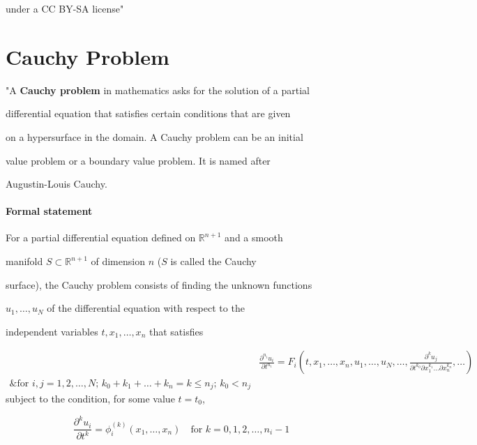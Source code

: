     under a CC BY-SA license"

\section{Cauchy Problem}
\label{sec:cauchy-problem}

"A \textbf{Cauchy problem} in mathematics asks for the solution of a partial

differential equation that satisfies certain conditions that are given

on a hypersurface in the domain. A Cauchy problem can be an initial

value problem or a boundary value problem. It is named after

Augustin-Louis Cauchy.



\paragraph{Formal statement}



For a partial differential equation defined on $\mathbb{R}^{n+1}$ and a smooth

manifold $S \subset \mathbb{R}^{n+1}$ of dimension $n$ ($S$ is called the Cauchy

surface), the Cauchy problem consists of finding the unknown functions

$u_1,\dots,u_N$ of the differential equation with respect to the

independent variables $t,x_1,\dots,x_n$ that satisfies



\begin{align}&\frac{\partial^{n_i}u_i}{\partial t^{n_i}} = F_i\left(t,x_1,\dots,x_n,u_1,\dots,u_N,\dots,\frac{\partial^k u_j}{\partial t^{k_0}\partial x_1^{k_1}\dots\partial x_n^{k_n}},\dots\right) \\\&\text{for } i,j = 1,2,\dots,N;\, k_0+k_1+\dots+k_n=k\leq n_j;\, k_0<n_j
\end{align} subject to the condition, for some value $t=t_0$,



$$\frac{\partial^k u_i}{\partial t^k}=\phi_i^{(k)}(x_1,\dots,x_n)

\quad \text{for } k=0,1,2,\dots,n_i-1$$



